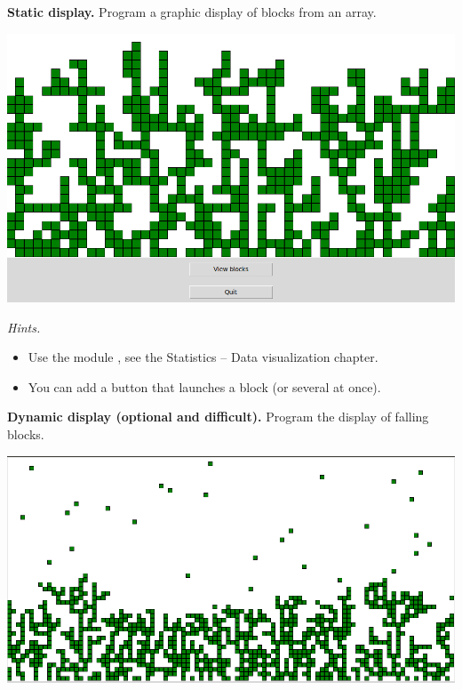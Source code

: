 \documentclass[11pt,class=report,crop=false]{standalone}
\begin{document}
\begin{activite}


\textbf{Static display.} Program a graphic display of blocks from an array.

\begin{center}
\includegraphics[scale=\myscale,scale=0.3]{screen-blocks-bloc1-en}
\end{center}
\medskip

\emph{Hints.}
\begin{itemize}
  \item Use the module , see the \og{}Statistics -- Data visualization\fg{} chapter.
  \item You can add a button that launches a block (or several at once). 
\end{itemize}

\medskip



\textbf{Dynamic display (optional and difficult).} Program the display of falling blocks.
\medskip

\begin{center}
\includegraphics[scale=\myscale,scale=0.3]{screen-blocks-bloc2}
\end{center}


\end{activite}
\end{document}
